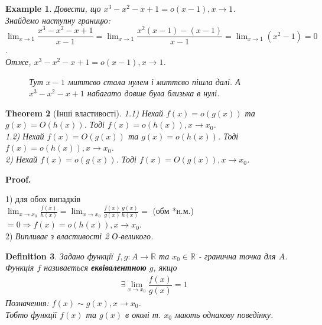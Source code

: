 \documentclass[a4paper, 14pt]{article}
\makeatletter
\def\huge{\displaystyle}
\def\qed{$\blacksquare$}
\theoremstyle{theoremdd}
\newtheorem{theorem}{Theorem}[subsection]
\theoremstyle{theoremdd}
\newtheorem{definition}[theorem]{Definition}
\theoremstyle{theoremdd}
\theoremstyle{theoremdd}
\newtheorem{example}[theorem]{Example}
\theoremstyle{theoremdd}
\theoremstyle{theoremdd}
\theoremstyle{theoremdd}
\theoremstyle{theoremdd}
\renewenvironment{proof}[1][Proof.\\]{\par
\pushQED{\hfill \qed}%
\normalfont \topsep6\p@\@plus6\p@\relax
\trivlist
\item\relax
{\bfseries
#1\@addpunct{.}}\hspace\labelsep\ignorespaces
}{%
\popQED\endtrivlist\@endpefalse
}
\makeatother
\begin{document}
\begin{example}
Довести, що $x^3 - x^2 - x + 1 = o(x-1), x \to 1$.\\
Знайдемо наступну границю:\\
$\huge \lim_{x \to 1} \dfrac{x^3-x^2-x+1}{x-1} = \lim_{x \to 1} \dfrac{x^2(x-1)-(x-1)}{x-1} = \lim_{x \to 1} (x^2-1) = 0$.\\
Отже, $x^3 - x^2 - x + 1 = o(x-1), x \to 1$.
\begin{figure} [H]
\centering
{
\caption*{Тут $x-1$ миттєво стала нулем і миттєво пішла далі. А $x^3-x^2-x+1$ набагато довше була близька в нулі.}
}
\end{figure}
\end{example}

\begin{theorem}[Інші властивості]
1.1) Нехай $f(x) = o(g(x))$ та $g(x) = O(h(x))$. Тоді $f(x) = o(h(x)), x \to x_0$.\\
1.2) Нехай $f(x) = O(g(x))$ та $g(x) = o(h(x))$. Тоді $f(x) = o(h(x)), x \to x_0$.
\bigskip \\
2) Нехай $f(x) = o(g(x))$. Тоді $f(x) = O(g(x)), x \to x_0$.
\end{theorem}

\begin{proof}
1) для обох випадків\\
$\huge \lim_{x \to x_0} \frac{f(x)}{h(x)} = \lim_{x \to x_0} \frac{f(x)}{g(x)} \frac{g(x)}{h(x)} =$ (обм *н.м.) $= 0 \Rightarrow f(x) = o(h(x)), x \to x_0$.
\bigskip \\
2) \textit{Випливає з властивості 2 О-великого.}
\end{proof}

\begin{definition}
Задано функції $f,g: A \to \mathbb{R}$ та $x_0 \in \mathbb{R}$ - гранична точка для $A$.\\
Функція $f$ називається \textbf{еквівалентною} $g$, якщо
\begin{align*}
\exists \huge\lim_{x \to x_0} \dfrac{f(x)}{g(x)} = 1
\end{align*}
Позначення: $f(x) \sim g(x), x \to x_0$.\\
Тобто функції $f(x)$ та $g(x)$ в околі т. $x_0$ мають однакову поведінку.
\end{definition}
\end{document}
